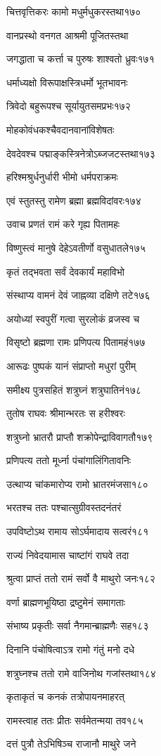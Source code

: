 चित्तवृत्तिकरः कामो मधुर्मधुकरस्तथा१७०

वानप्रस्थो वनगत आश्रमी पूजितस्तथा

जगद्धाता च कर्त्ता च पुरुषः शाश्वतो ध्रुवः१७१

धर्माध्यक्षो विरूपाक्षस्त्रिधर्मो भूतभावनः

त्रिवेदो बहुरूपश्च सूर्यायुतसमप्रभः१७२

मोहकोवंधकश्चैवदानवानांविशेषतः

देवदेवश्च पद्माङ्कस्त्रिनेत्रोऽब्जजटस्तथा१७३

हरिश्मश्रुर्धनुर्धारी भीमो धर्मपराक्रमः

एवं स्तुतस्तु रामेण ब्रह्मा ब्रह्मविदांवरः१७४

उवाच प्रणतं रामं करे गृह्य पितामहः

विष्णुस्त्वं मानुषे देहेऽवतीर्णो वसुधातले१७५

कृतं तद्भवता सर्वं देवकार्यं महाविभो

संस्थाप्य वामनं देवं जाह्नव्या दक्षिणे तटे१७६

अयोध्यां स्वपुरीं गत्वा सुरलोकं व्रजस्व च

विसृष्टो ब्रह्मणा रामः प्रणिपत्य पितामहं१७७

आरूढः पुष्पकं यानं संप्राप्तो मधुरां पुरीम्

समीक्ष्य पुत्रसहितं शत्रुघ्नं शत्रुघातिनं१७८

तुतोष राघवः श्रीमान्भरतः स हरीश्वरः

शत्रुघ्नो भ्रातरौ प्राप्तौ शक्रोपेन्द्राविवागतौ१७९

प्रणिपत्य ततो मूर्ध्ना पंचांगालिंगितावनिः

उत्थाप्य चांकमारोप्य रामो भ्रातरमंजसा१८०

भरतश्च ततः पश्चात्सुग्रीवस्तदनंतरं

उपविष्टोऽथ रामाय सोऽर्घमादाय सत्वरं१८१

राज्यं निवेदयामास चाष्टांगं राघवे तदा

श्रुत्वा प्राप्तं ततो रामं सर्वो वै माथुरो जनः१८२

वर्णा ब्राह्मणभूयिष्ठा द्रष्टुमेनं समागताः

संभाष्य प्रकृतीः सर्वा नैगमान्ब्राह्मणैः सह१८३

दिनानि पंचोषित्वाऽत्र रामो गंतुं मनो दधे

शत्रुघ्नश्च ततो रामे वाजिनोथ गजांस्तथा१८४

कृताकृतं च कनकं तत्रोपायनमाहरत्

रामस्त्वाह ततः प्रीतः सर्वमेतन्मया तव१८५

दत्तं पुत्रौ तेऽभिषिञ्च राजानौ माथुरे जने

